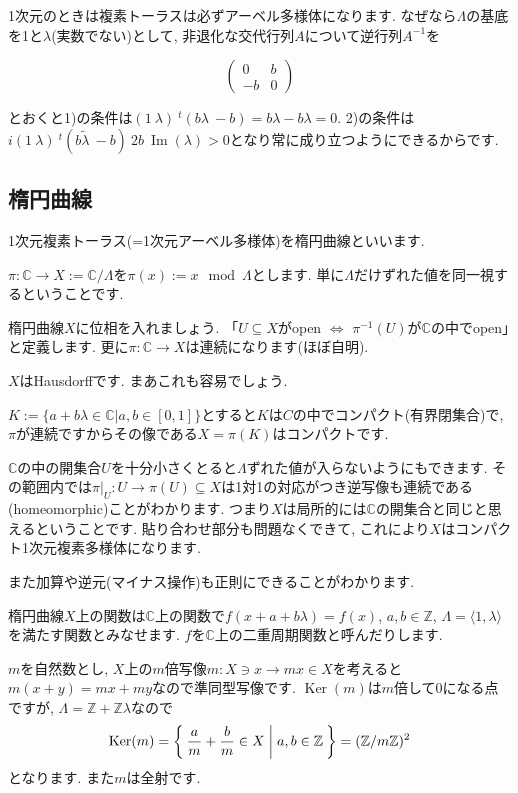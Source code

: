 \documentclass{jsarticle}
\newcommand{\CC}{\mathbb{C}}
\newcommand{\ZZ}{\mathbb{Z}}
\newcommand{\makeop}[1]{\mathop{\mathrm{#1}}\nolimits}
\def\Im{\makeop{Im}}
\def\Ker{\makeop{Ker}}
\theoremstyle{definition}
\numberwithin{theorem}{section}
\begin{document}
1次元のときは複素トーラスは必ずアーベル多様体になります. なぜなら$\Lambda$の基底を1と$\lambda$(実数でない)として, 非退化な交代行列$A$について逆行列$A^{-1}$を

\begin{equation*}
\begin{pmatrix}
0 & b \\
-b & 0
\end{pmatrix}
\end{equation*}

とおくと1)の条件は$(1\ \lambda)\ {}^t(b\lambda\ -b) = b\lambda - b\lambda = 0$.
2)の条件は$i(1\ \lambda)\ {}^t(b\tilde\lambda\ -b)\ 2b\ \Im(\lambda) > 0$となり常に成り立つようにできるからです.

\subsection{楕円曲線}
1次元複素トーラス(=1次元アーベル多様体)を楕円曲線といいます.

$\pi: \CC\rightarrow X := \CC/\Lambda$を$\pi(x) := x \mod \Lambda$とします. 単に$\Lambda$だけずれた値を同一視するということです.

楕円曲線$X$に位相を入れましょう. 「$U\subseteq X$がopen $\Leftrightarrow$ $\pi^{-1}(U)$が$\CC$の中でopen」と定義します. 更に$\pi: \CC \rightarrow X$は連続になります(ほぼ自明).

$X$はHausdorffです. まあこれも容易でしょう.

$K := \{a+b\lambda \in \CC | a, b \in [0, 1]\}$とすると$K$は$C$の中でコンパクト(有界閉集合)で, $\pi$が連続ですからその像である$X = \pi(K)$はコンパクトです.

$\CC$の中の開集合$U$を十分小さくとると$\Lambda$ずれた値が入らないようにもできます. その範囲内では$\pi|_U: U \rightarrow \pi(U) \subseteq X$は1対1の対応がつき逆写像も連続である(homeomorphic)ことがわかります. つまり$X$は局所的には$\CC$の開集合と同じと思えるということです. 貼り合わせ部分も問題なくできて, これにより$X$はコンパクト1次元複素多様体になります.

また加算や逆元(マイナス操作)も正則にできることがわかります.

楕円曲線$X$上の関数は$\CC$上の関数で$f(x+a+b\lambda) = f(x)$, $a, b \in\ZZ$, $\Lambda = \langle1, \lambda\rangle$を満たす関数とみなせます. $f$を$\CC$上の二重周期関数と呼んだりします.

$m$を自然数とし, $X$上の$m$倍写像$m: X \ni x \rightarrow mx \in X$を考えると$m(x+y) = mx+my$なので準同型写像です. $\Ker(m)$は$m$倍して0になる点ですが, $\Lambda = \ZZ + \ZZ\lambda$なので
\[
\Ker(m) = \Set{\frac{a}{m} + \frac{b}{m}\in X | a, b \in \ZZ} = (\ZZ/m\ZZ)^2
\]
となります. また$m$は全射です.
\end{document}

